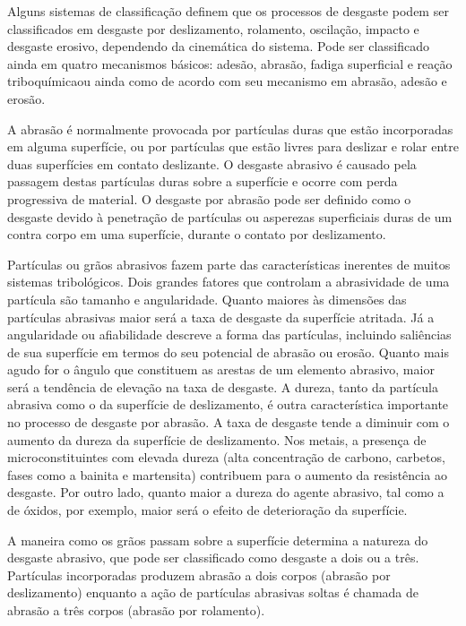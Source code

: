 Alguns sistemas de classificação definem que os processos de desgaste podem ser
classificados em desgaste por deslizamento, rolamento, oscilação, impacto e
desgaste erosivo, dependendo da cinemática do sistema. Pode ser classificado
ainda em quatro mecanismos básicos: adesão, abrasão, fadiga superficial e reação
triboquímicaou ainda como de acordo com seu mecanismo em abrasão, adesão e
erosão.

A abrasão é normalmente provocada por partículas duras que estão incorporadas
em alguma superfície, ou por partículas que estão livres para deslizar e rolar
entre duas superfícies em contato deslizante. O desgaste abrasivo é causado
pela passagem destas partículas duras sobre a superfície e ocorre com perda
progressiva de material. O desgaste por abrasão pode ser definido como o
desgaste devido à penetração de partículas ou asperezas superficiais duras de
um contra corpo em uma superfície, durante o contato por deslizamento.

Partículas ou grãos abrasivos fazem parte das características inerentes de
muitos sistemas tribológicos. Dois grandes fatores que controlam a abrasividade
de uma partícula são tamanho e angularidade. Quanto maiores às dimensões das
partículas abrasivas maior será a taxa de desgaste da superfície atritada. Já a
angularidade ou afiabilidade descreve a forma das partículas, incluindo
saliências de sua superfície em termos do seu potencial de abrasão ou erosão.
Quanto mais agudo for o ângulo que constituem as arestas de um elemento
abrasivo, maior será a tendência de elevação na taxa de desgaste. A dureza,
tanto da partícula abrasiva como o da superfície de deslizamento, é outra
característica importante no processo de desgaste por abrasão. A taxa de
desgaste tende a diminuir com o aumento da dureza da superfície de
deslizamento. Nos metais, a presença de microconstituintes com elevada dureza
(alta concentração de carbono, carbetos, fases como a bainita e martensita)
contribuem para o aumento da resistência ao desgaste. Por outro lado, quanto
maior a dureza do agente abrasivo, tal como a de óxidos, por exemplo, maior
será o efeito de deterioração da superfície. 

A maneira como os grãos passam sobre a superfície determina a natureza do
desgaste abrasivo, que pode ser classificado como desgaste a dois ou a três.
Partículas incorporadas produzem abrasão a dois corpos (abrasão por
deslizamento) enquanto a ação de partículas abrasivas soltas é chamada de
abrasão a três corpos (abrasão por rolamento).

